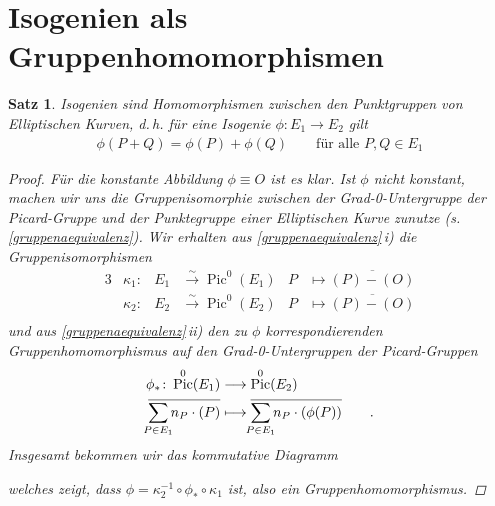 \documentclass[english, german, parskip=half]{scrartcl}
\newtheorem{Satz}{Satz}[section]
\theoremstyle{definition}
\theoremstyle{remark}
\newcommand*{\longto}{\longrightarrow}
\DeclareMathOperator{\Pic}{Pic} %
\begin{document}
\section{Isogenien als Gruppenhomomorphismen}
\begin{Satz}\label{isogenienhoms}
  Isogenien sind Homomorphismen zwischen den Punktgruppen von
  Elliptischen Kurven, d.\,h. für eine Isogenie $\phi\colon E_1\to
  E_2$ gilt
  \begin{gather*}
    \phi(P+Q) = \phi(P) + \phi(Q)
    \qquad \text{für alle } P,Q\in E_1
  \end{gather*}
\begin{proof}
  Für die konstante Abbildung $\phi\equiv O$ ist es klar.
  Ist $\phi$ nicht konstant, machen wir uns die Gruppenisomorphie
  zwischen der Grad-0-Untergruppe der Picard-Gruppe und der
  Punktegruppe einer Elliptischen Kurve zunutze
  (s.\,\autoref{gruppenaequivalenz}).
  Wir erhalten 
  aus \autoref{gruppenaequivalenz}\,i) die Gruppenisomorphismen 
  \begin{alignat*}{3}
    &\kappa_1\colon&
    E_1&\overset\sim\longto \Pic^0(E_1)
    &P &\longmapsto \overline{(P)-(O)}\\
    &\kappa_2\colon&
    E_2&\overset\sim\longto \Pic^0(E_2)
    &P &\longmapsto \overline{(P)-(O)}\\
  \end{alignat*}
  und aus \autoref{gruppenaequivalenz}\,ii) den zu $\phi$
  korrespondierenden Gruppenhomomorphismus auf den Grad-0-Untergruppen
  der Picard-Gruppen
  \begin{align*}
    \phi_*\colon \Pic^0(E_1) 
    &\longto \Pic^0(E_2)\\
    \overline{\sum_{\mathclap{P\in E_1}}n_P\cdot(P)}
    &\longmapsto 
      \overline{\sum_{\mathclap{P\in E_1}}n_P\cdot(\phi(P))}
      \qquad .
  \end{align*}
  Insgesamt bekommen wir das kommutative Diagramm
  \begin{center}
  \end{center}
  welches zeigt, dass $\phi=\kappa_2^{-1}\circ\phi_*\circ\kappa_1$
  ist, also ein Gruppenhomomorphismus.
\end{proof}
\end{Satz}
\end{document}
